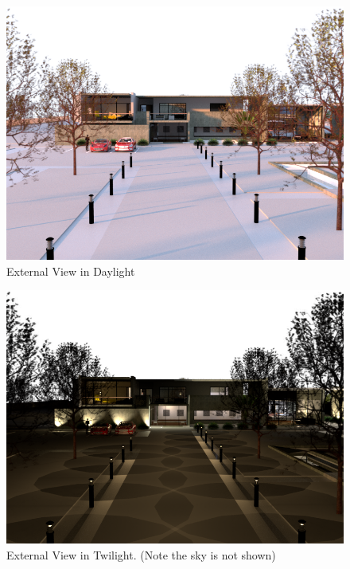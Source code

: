 \begin{figure}[h]
	\centering
	\includegraphics[width=1.0\linewidth]{img/Assignment3a}
	\caption{External View in Daylight}
	\label{fig:assignment3a}
\end{figure}


\begin{figure}[h]
	\centering
	\includegraphics[width=1.0\linewidth]{img/Assignment3b}
	\caption{External View in Twilight.  (Note the sky is not shown)}
	\label{fig:assignment3b}
\end{figure}


